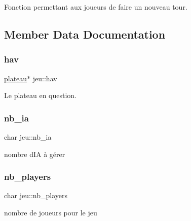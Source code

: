 Fonction permettant aux joueurs de faire un nouveau tour. 



\subsection{Member Data Documentation}
\mbox{\label{classjeu_a7bd7f0a6992c018ddc2cdf2a0c6e1930}} 
\subsubsection{\texorpdfstring{hav}{hav}}
{\footnotesize\ttfamily \hyperlink{classplateau}{plateau}$\ast$ jeu\+::hav\hspace{0.3cm}{\ttfamily [private]}}



Le plateau en question. 

\mbox{\label{classjeu_a725c0616180898259dd472d009e844fc}} 
\subsubsection{\texorpdfstring{nb\+\_\+ia}{nb\_ia}}
{\footnotesize\ttfamily char jeu\+::nb\+\_\+ia\hspace{0.3cm}{\ttfamily [private]}}



nombre d\textquotesingle{}IA à gérer 

\mbox{\label{classjeu_af5d010efc2e6dec9ea8da739bd5f19b5}} 
\subsubsection{\texorpdfstring{nb\+\_\+players}{nb\_players}}
{\footnotesize\ttfamily char jeu\+::nb\+\_\+players\hspace{0.3cm}{\ttfamily [private]}}



nombre de joueurs pour le jeu 

\mbox{\label{classjeu_ae28d01ac3e91246e6269df4d62470913}} 

